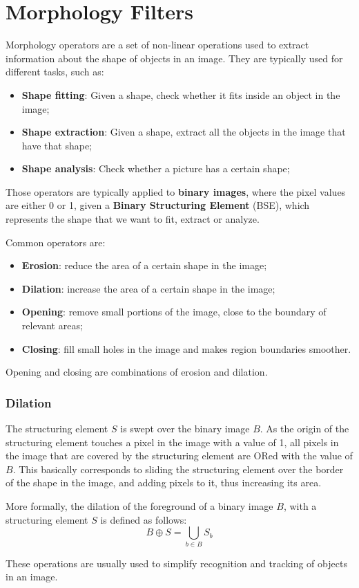 \section{Morphology Filters}
Morphology operators are a set of non-linear operations used to extract information about the shape of objects in an image.
They are typically used for different tasks, such as:
\begin{itemize}
    \item \textbf{Shape fitting}: Given a shape, check whether it fits inside an object in the image;
    \item \textbf{Shape extraction}: Given a shape, extract all the objects in the image that have that shape;
    \item \textbf{Shape analysis}: Check whether a picture has a certain shape; 
\end{itemize}
Those operators are typically applied to \textbf{binary images}, where the pixel values are either 0 or 1, given a \textbf{Binary Structuring Element} (BSE),
which represents the shape that we want to fit, extract or analyze.

Common operators are:
\begin{itemize}
    \item \textbf{Erosion}: reduce the area of a certain shape in the image;
    \item \textbf{Dilation}: increase the area of a certain shape in the image;
    \item \textbf{Opening}: remove small portions of the image, close to the boundary of relevant areas;
    \item \textbf{Closing}: fill small holes in the image and makes region boundaries smoother.
\end{itemize}
Opening and closing are combinations of erosion and dilation.

\subsubsection*{Dilation}
The structuring element $S$ is swept over the binary image $B$. As the origin of the structuring element touches a pixel in the image with a value of 1,
all pixels in the image that are covered by the structuring element are ORed with the value of $B$.
This basically corresponds to sliding the structuring element over the border of the shape in the image, and adding pixels to it, thus increasing its area.

More formally, the dilation of the foreground of a binary image $B$, with a structuring element $S$ is defined as follows:
\begin{equation}
    B \oplus S = \bigcup_{b \in B} S_b
\end{equation}

These operations are usually used to simplify recognition and tracking of objects in an image.

